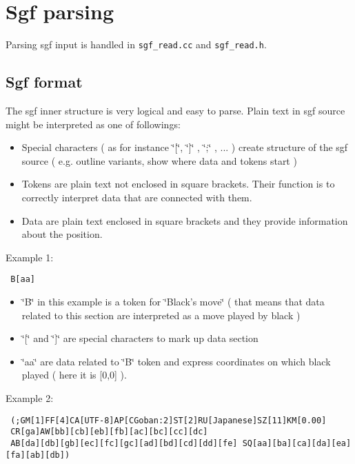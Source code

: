 \section{Sgf parsing}\label{page_5}
Parsing sgf input is handled in {\tt sgf\_\-read.cc} and {\tt sgf\_\-read.h}.\subsection{Sgf format}\label{page_5_page_5__sec_1}
The sgf inner structure is very logical and easy to parse. Plain text in sgf source might be interpreted as one of followings:\begin{itemize}
\item Special characters ( as for instance \char`\"{}[\char`\"{}, \char`\"{}]\char`\"{} , \char`\"{};\char`\"{} , ... ) create structure of the sgf source ( e.g. outline variants, show where data and tokens start )\item Tokens are plain text not enclosed in square brackets. Their function is to correctly interpret data that are connected with them.\item Data are plain text enclosed in square brackets and they provide information about the position.\end{itemize}


Example 1: 

\footnotesize\begin{verbatim} B[aa] 
\end{verbatim}
\normalsize


\begin{itemize}
\item \char`\"{}B\char`\"{} in this example is a token for \char`\"{}Black's move\char`\"{} ( that means that data related to this section are interpreted as a move played by black )\item \char`\"{}[\char`\"{} and \char`\"{}]\char`\"{} are special characters to mark up data section\item \char`\"{}aa\char`\"{} are data related to \char`\"{}B\char`\"{} token and express coordinates on which black played ( here it is [0,0] ).\end{itemize}


Example 2: 

\footnotesize\begin{verbatim} (;GM[1]FF[4]CA[UTF-8]AP[CGoban:2]ST[2]RU[Japanese]SZ[11]KM[0.00] 
 CR[ga]AW[bb][cb][eb][fb][ac][bc][cc][dc]
 AB[da][db][gb][ec][fc][gc][ad][bd][cd][dd][fe] SQ[aa][ba][ca][da][ea][fa][ab][db]) 
\end{verbatim}
\normalsize


